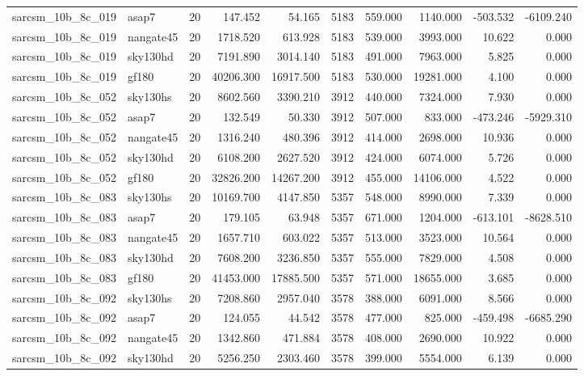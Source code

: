 \begin{tabular}{llrrrrrrrr}
sarcsm\_10b\_8c\_019 & asap7 & 20 & 147.452 & 54.165 & 5183 & 559.000 & 1140.000 & -503.532 & -6109.240 \\
sarcsm\_10b\_8c\_019 & nangate45 & 20 & 1718.520 & 613.928 & 5183 & 539.000 & 3993.000 & 10.622 & 0.000 \\
sarcsm\_10b\_8c\_019 & sky130hd & 20 & 7191.890 & 3014.140 & 5183 & 491.000 & 7963.000 & 5.825 & 0.000 \\
sarcsm\_10b\_8c\_019 & gf180 & 20 & 40206.300 & 16917.500 & 5183 & 530.000 & 19281.000 & 4.100 & 0.000 \\
sarcsm\_10b\_8c\_052 & sky130hs & 20 & 8602.560 & 3390.210 & 3912 & 440.000 & 7324.000 & 7.930 & 0.000 \\
sarcsm\_10b\_8c\_052 & asap7 & 20 & 132.549 & 50.330 & 3912 & 507.000 & 833.000 & -473.246 & -5929.310 \\
sarcsm\_10b\_8c\_052 & nangate45 & 20 & 1316.240 & 480.396 & 3912 & 414.000 & 2698.000 & 10.936 & 0.000 \\
sarcsm\_10b\_8c\_052 & sky130hd & 20 & 6108.200 & 2627.520 & 3912 & 424.000 & 6074.000 & 5.726 & 0.000 \\
sarcsm\_10b\_8c\_052 & gf180 & 20 & 32826.200 & 14267.200 & 3912 & 455.000 & 14106.000 & 4.522 & 0.000 \\
sarcsm\_10b\_8c\_083 & sky130hs & 20 & 10169.700 & 4147.850 & 5357 & 548.000 & 8990.000 & 7.339 & 0.000 \\
sarcsm\_10b\_8c\_083 & asap7 & 20 & 179.105 & 63.948 & 5357 & 671.000 & 1204.000 & -613.101 & -8628.510 \\
sarcsm\_10b\_8c\_083 & nangate45 & 20 & 1657.710 & 603.022 & 5357 & 513.000 & 3523.000 & 10.564 & 0.000 \\
sarcsm\_10b\_8c\_083 & sky130hd & 20 & 7608.200 & 3236.850 & 5357 & 555.000 & 7829.000 & 4.508 & 0.000 \\
sarcsm\_10b\_8c\_083 & gf180 & 20 & 41453.000 & 17885.500 & 5357 & 571.000 & 18655.000 & 3.685 & 0.000 \\
sarcsm\_10b\_8c\_092 & sky130hs & 20 & 7208.860 & 2957.040 & 3578 & 388.000 & 6091.000 & 8.566 & 0.000 \\
sarcsm\_10b\_8c\_092 & asap7 & 20 & 124.055 & 44.542 & 3578 & 477.000 & 825.000 & -459.498 & -6685.290 \\
sarcsm\_10b\_8c\_092 & nangate45 & 20 & 1342.860 & 471.884 & 3578 & 408.000 & 2690.000 & 10.922 & 0.000 \\
sarcsm\_10b\_8c\_092 & sky130hd & 20 & 5256.250 & 2303.460 & 3578 & 399.000 & 5554.000 & 6.139 & 0.000 \\

\end{tabular}

